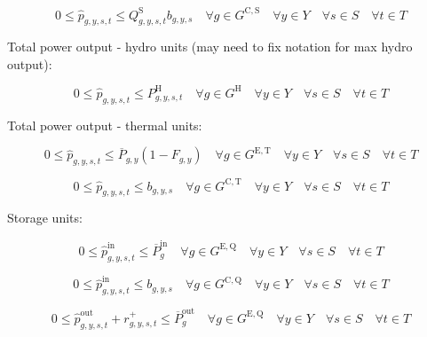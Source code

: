 \documentclass{article}
\newcommand{\sGeneratorsExistingThermal}{G^{\mathrm{E,T}}}
\newcommand{\sGeneratorsCandidateThermal}{G^{\mathrm{C,T}}}
\newcommand{\sGeneratorsCandidateSolar}{G^{\mathrm{C,S}}}
\newcommand{\sGeneratorsHydro}{G^{\mathrm{H}}}
\newcommand{\sStorageExisting}{G^{\mathrm{E,Q}}}
\newcommand{\sStorageCandidate}{G^{\mathrm{C,Q}}}
\newcommand{\sYears}{Y}
\newcommand{\sScenarios}{S}
\newcommand{\sIntervals}{T}
\newcommand{\iGenerator}{g}
\newcommand{\iYear}{y}
\newcommand{\iScenario}{s}
\newcommand{\iInterval}{t}
\newcommand{\cPowerOutputMax}[1][\iGenerator,\iYear]{\overline{P}_{#1}}
\newcommand{\cCapacityFactor}[1][\iGenerator,\iYear,\iScenario,\iInterval]{Q_{#1}}
\newcommand{\cPowerChargingMax}[1][\iGenerator]{\overline{P}^{\mathrm{in}}_{#1}}
\newcommand{\cPowerDischargingMax}[1][\iGenerator]{\overline{P}^{\mathrm{out}}_{#1}}
\newcommand{\cRetirementIndicator}[1][\iGenerator,\iYear]{F_{#1}}
\newcommand{\cPowerOutputHydro}[1][\iGenerator,\iYear,\iScenario,\iInterval]{P^{\mathrm{H}}_{#1}}
\newcommand{\vReserveUp}[1][\iGenerator,\iYear,\iScenario,\iInterval]{r^{+}_{#1}}
\newcommand{\vPowerTotal}[1][\iGenerator,\iYear,\iScenario,\iInterval]{\hat{p}_{#1}}
\newcommand{\vPowerTotalIn}[1][\iGenerator,\iYear,\iScenario,\iInterval]{\hat{p}^{\mathrm{in}}_{#1}}
\newcommand{\vPowerTotalOut}[1][\iGenerator,\iYear,\iScenario,\iInterval]{\hat{p}^{\mathrm{out}}_{#1}}
\newcommand{\vInstalledCapacityTotalScenario}[1][\iGenerator,\iYear,\iScenario]{b_{#1}}
\begin{document}
\begin{equation}
0 \leq \vPowerTotal \leq \cCapacityFactor^{\mathrm{S}} \vInstalledCapacityTotalScenario \quad \forall \iGenerator \in \sGeneratorsCandidateSolar \quad \forall \iYear \in \sYears \quad \forall \iScenario \in \sScenarios \quad \forall \iInterval \in \sIntervals
\end{equation}

Total power output - hydro units (may need to fix notation for max hydro output):

\begin{equation}
0 \leq \vPowerTotal \leq \cPowerOutputHydro \quad \forall \iGenerator \in \sGeneratorsHydro \quad \forall \iYear \in \sYears \quad \forall \iScenario \in \sScenarios \quad \forall \iInterval \in \sIntervals 
\end{equation}

Total power output - thermal units:

\begin{equation}
0 \leq \vPowerTotal \leq \cPowerOutputMax \left(1 - \cRetirementIndicator \right) \quad \forall \iGenerator \in \sGeneratorsExistingThermal \quad \forall \iYear \in \sYears \quad \forall \iScenario \in \sScenarios \quad \forall \iInterval \in \sIntervals
\end{equation}

\begin{equation}
0 \leq \vPowerTotal \leq \vInstalledCapacityTotalScenario \quad \forall \iGenerator \in \sGeneratorsCandidateThermal \quad \forall \iYear \in \sYears \quad \forall \iScenario \in \sScenarios \quad \forall \iInterval \in \sIntervals
\end{equation}

Storage units:

\begin{equation}
0 \leq \vPowerTotalIn \leq \cPowerChargingMax \quad \forall \iGenerator \in \sStorageExisting \quad \forall \iYear \in \sYears \quad \forall \iScenario \in \sScenarios \quad \forall \iInterval \in \sIntervals
\end{equation}

\begin{equation}
0 \leq \vPowerTotalIn \leq \vInstalledCapacityTotalScenario \quad \forall \iGenerator \in \sStorageCandidate \quad \forall \iYear \in \sYears \quad \forall \iScenario \in \sScenarios \quad \forall \iInterval \in \sIntervals
\end{equation}

\begin{equation}
0 \leq \vPowerTotalOut + \vReserveUp \leq \cPowerDischargingMax \quad \forall \iGenerator \in \sStorageExisting \quad \forall \iYear \in \sYears \quad \forall \iScenario \in \sScenarios \quad \forall \iInterval \in \sIntervals
\end{equation}
\end{document}
